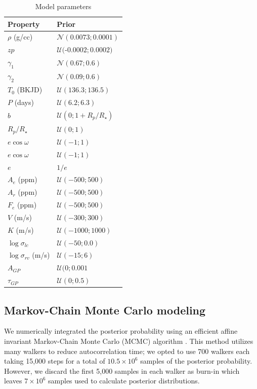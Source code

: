\documentclass[apjl]{emulateapj}
\begin{document}
\begin{table}
\centering
\caption{Model parameters}\label{tab:priors}
\begin{tabular}{l l }
Property & Prior \\
\hline
$\rho$ (g/cc)		&	$\mathcal{N}(0.0073;0.0001)$ \\
$zp$				& 	$\mathcal{U}($-$0.0002;0.0002)$\\
$\gamma_1$		&	$\mathcal{N}(0.67;0.6)$ \\
$\gamma_2$		&	$\mathcal{N}(0.09;0.6)$\\
$T_0$ (BKJD)& $\mathcal{U}(136.3;136.5)$\\
$P$ (days) & $\mathcal{U}(6.2;6.3)$\\
$b$ & $\mathcal{U}(0;1+R_{p}/R_{\star})$\\
$R_{p}/R_{\star}$ & $\mathcal{U}(0;1)$ \\
$e\cos{\omega}$ &$\mathcal{U}(-1;1)$ \\
$e\cos{\omega}$ & $\mathcal{U}(-1;1)$\\
$e$ & $1/e$\\
$A_e$ (ppm)&$\mathcal{U}(-500;500)$ \\
$A_r$ (ppm)& $\mathcal{U}(-500;500)$\\
$F_e$ (ppm)& $\mathcal{U}(-500;500)$\\
$V$ (m/s)&$\mathcal{U}(-300;300)$ \\
$K$ (m/s)&$\mathcal{U}(-1000;1000)$ \\
$\log \sigma_{lc}$ & $\mathcal{U}(-50;0.0)$\\
$\log \sigma_{rv}$ (m/s)&$\mathcal{U}(-15;6)$ \\
$A_{GP}$ &  $\mathcal{U}(0;0.001$ \\
$\tau_{GP}$ &  $\mathcal{U}(0;0.5)$ \\
\hline
\end{tabular}
\end{table}

\subsection{Markov-Chain Monte Carlo modeling}
We numerically integrated the posterior probability using an efficient affine invariant Markov-Chain Monte Carlo (MCMC) algorithm \citep{goodman10,foreman13}.  This method utilizes many walkers to reduce autocorrelation time; we opted to use 700 walkers each taking 15,000 steps for a total of $10.5\times10^6$ samples of the posterior probability. However, we discard the first 5,000 samples in each walker as burn-in which leaves $7\times10^6$ samples used to calculate posterior distributions.
\end{document}
